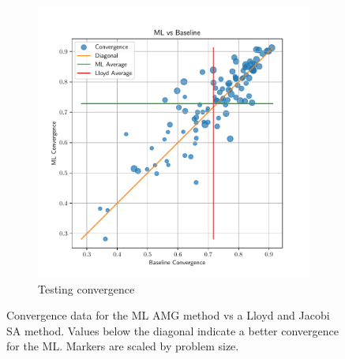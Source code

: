\documentclass{article}
\begin{document}
\begin{figure}[!hb]
\begin{subfigure}[t]{0.49\textwidth}
    \includegraphics[width=\textwidth]{aniso3d_test_baseline_ml_convergence.pdf}
    \caption{Testing convergence}
  \end{subfigure}
  \caption{Convergence data for the ML AMG method vs a Lloyd and Jacobi SA method.  Values below the diagonal indicate a better convergence for the ML.  Markers are scaled by problem size.}
  \label{fig:aniso_conv}
\end{figure}
\bigskip\bigskip
\end{document}
